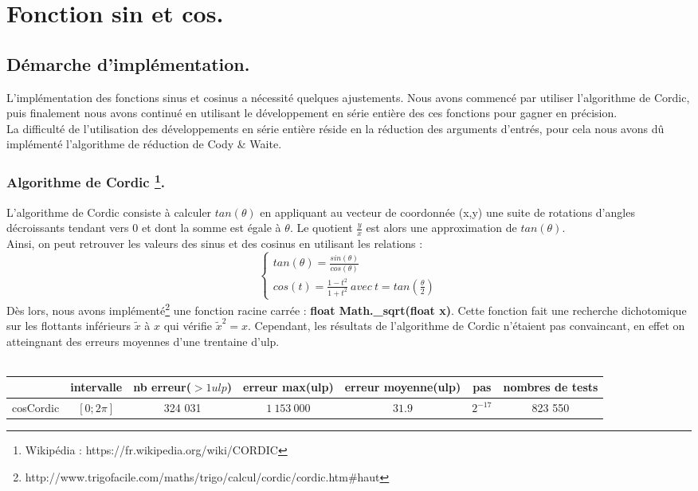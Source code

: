 \documentclass[a4,12pt]{article}
\begin{document}
\section{Fonction sin et cos.}
\subsection{Démarche d'implémentation.}
L'implémentation des fonctions sinus et cosinus a nécessité quelques ajustements. Nous avons commencé par utiliser l'algorithme de Cordic, puis finalement nous avons continué en utilisant le développement en série entière des ces fonctions pour gagner en précision. \\
La difficulté de l'utilisation des développements en série entière réside en la réduction des arguments d'entrés, pour cela nous avons dû implémenté l'algorithme de réduction de Cody \& Waite.
\subsubsection{Algorithme de Cordic \footnote{Wikipédia : https://fr.wikipedia.org/wiki/CORDIC}.}
L'algorithme de Cordic consiste à calculer $tan(\theta)$ en appliquant au vecteur de coordonnée (x,y) une suite de rotations d'angles décroissants tendant vers 0 et dont la somme est égale à $\theta$. Le quotient $\frac{y}{x}$ est alors une approximation de $tan(\theta)$. \\
Ainsi, on peut retrouver les valeurs des sinus et des cosinus en utilisant les relations : 
$$
 \left \{
    \begin{array}{l}
        tan(\theta) = \frac{sin(\theta)}{cos(\theta)}\ \\
        cos(t) = \frac{1-t^2}{1+t^2}\ avec\ t = tan(\frac{\theta}{2})
    \end{array}
\right .
$$
Dès lors, nous avons implémenté\footnote{http://www.trigofacile.com/maths/trigo/calcul/cordic/cordic.htm#haut} une fonction racine carrée : \textbf{float Math.\_sqrt(float x)}. Cette fonction fait une recherche dichotomique sur les flottants inférieurs $\tilde x$ à $x$ qui vérifie $ \tilde x^2 = x $. Cependant, les résultats de l'algorithme de Cordic n'étaient pas convaincant, en effet on atteingnant des erreurs moyennes d'une trentaine d'ulp. \\
\\

\hspace{-4cm}
\begin{tabular}{|c|c|c|c|c|c|c|}

\hline 
 & intervalle & nb erreur($ >1 ulp$) & erreur max(ulp) & erreur moyenne(ulp) & pas & nombres de tests \\
\hline 
cosCordic & $[0; 2\pi]$ & 324 031 & $1\ 153\ 000$  & $31.9$ & $2^{-17}$ & 823 550 \\
\hline
\end{tabular}
\end{document}
